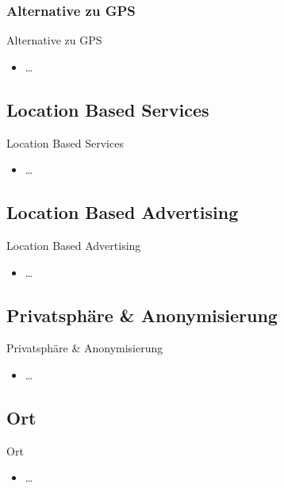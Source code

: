 \subsubsection{Alternative zu GPS}
\begin{frame}{Alternative zu GPS}
\begin{itemize}
  \item \dots
\end{itemize}
\end{frame}

\subsection{Location Based Services}
\begin{frame}{Location Based Services}
\begin{itemize}
  \item \dots
\end{itemize}
\end{frame}

\subsection{Location Based Advertising}
\begin{frame}{Location Based Advertising}
\begin{itemize}
  \item \dots
\end{itemize}
\end{frame}

\subsection{Privatsphäre \& Anonymisierung}
\begin{frame}{Privatsphäre \& Anonymisierung}
\begin{itemize}
  \item \dots
\end{itemize}
\end{frame}

\subsection{Ort}
\begin{frame}{Ort}
\begin{itemize}
  \item \dots
\end{itemize}
\end{frame}

